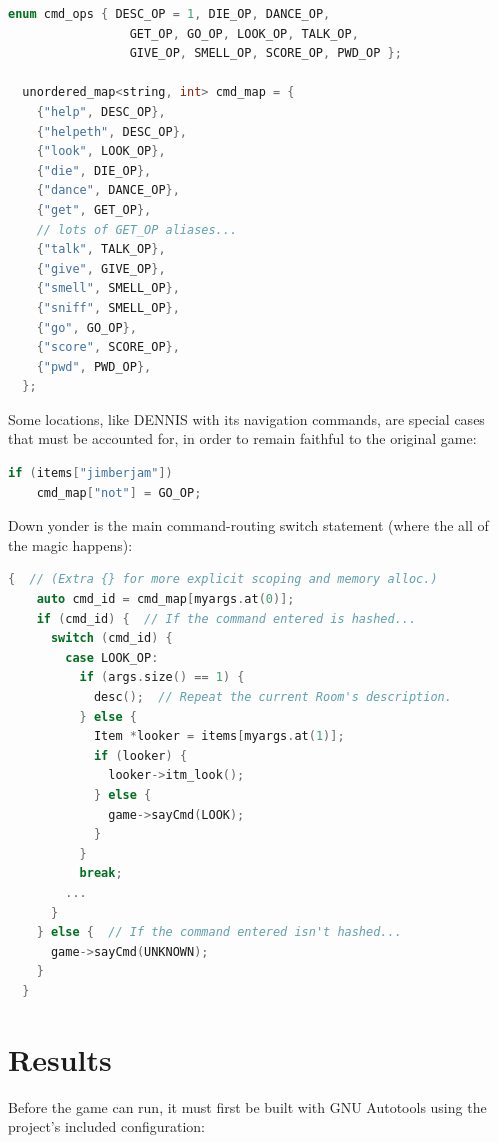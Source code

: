 \documentclass[man,12pt]{apa6}
\begin{document}
\begin{framed}
\begin{lstlisting}[language=C++]
  enum cmd_ops { DESC_OP = 1, DIE_OP, DANCE_OP,
                 GET_OP, GO_OP, LOOK_OP, TALK_OP,
                 GIVE_OP, SMELL_OP, SCORE_OP, PWD_OP };

  unordered_map<string, int> cmd_map = {
    {"help", DESC_OP},
    {"helpeth", DESC_OP},
    {"look", LOOK_OP},
    {"die", DIE_OP},
    {"dance", DANCE_OP},
    {"get", GET_OP},
    // lots of GET_OP aliases...
    {"talk", TALK_OP},
    {"give", GIVE_OP},
    {"smell", SMELL_OP},
    {"sniff", SMELL_OP},
    {"go", GO_OP},
    {"score", SCORE_OP},
    {"pwd", PWD_OP},
  };
\end{lstlisting}
\end{framed}

Some locations, like \textsf{DENNIS} with its navigation commands, are
special cases that must be accounted for, in order to remain faithful to the
original game:
\begin{framed}
\begin{lstlisting}[language=C++]
  if (items["jimberjam"])
    cmd_map["not"] = GO_OP;
\end{lstlisting}
\end{framed}

Down yonder is the main command-routing \textsf{switch} statement (where the
all of the magic happens):
\begin{framed}
\begin{lstlisting}[language=C++]
  {  // (Extra {} for more explicit scoping and memory alloc.)
    auto cmd_id = cmd_map[myargs.at(0)];
    if (cmd_id) {  // If the command entered is hashed...
      switch (cmd_id) {
        case LOOK_OP:
          if (args.size() == 1) {
            desc();  // Repeat the current Room's description.
          } else {
            Item *looker = items[myargs.at(1)];
            if (looker) {
              looker->itm_look();
            } else {
              game->sayCmd(LOOK);
            }
          }
          break;
        ...
      }
    } else {  // If the command entered isn't hashed...
      game->sayCmd(UNKNOWN);
    }
  }
\end{lstlisting}
\end{framed}

\section{Results}
Before the game can run, it must first be built with GNU Autotools using the
project's included configuration:
\end{document}
